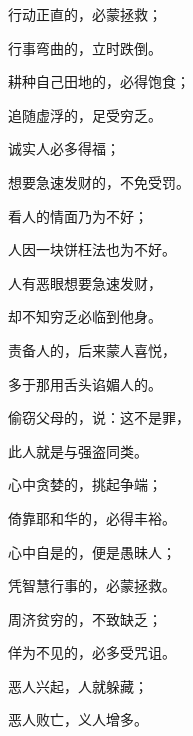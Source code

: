 {\par }{\Q {}行动正直的，必蒙拯救；
\par }{\Q 行事弯曲的，立时跌倒。
\par }{\Q {}耕种自己田地的，必得饱食；
\par }{\Q 追随虚浮的，足受穷乏。
\par }{\Q {}诚实人必多得福；
\par }{\Q 想要急速发财的，不免受罚。
\par }{\Q {}看人的情面乃为不好；
\par }{\Q 人因一块饼枉法也为不好。
\par }{\Q {}人有恶眼想要急速发财，
\par }{\Q 却不知穷乏必临到他身。
\par }{\Q {}责备人的，后来蒙人喜悦，
\par }{\Q 多于那用舌头谄媚人的。
\par }{\Q {}偷窃父母的，说：这不是罪，
\par }{\Q 此人就是与强盗同类。
\par }{\Q {}心中贪婪的，挑起争端；
\par }{\Q 倚靠耶和华的，必得丰裕。
\par }{\Q {}心中自是的，便是愚昧人；
\par }{\Q 凭智慧行事的，必蒙拯救。
\par }{\Q {}周济贫穷的，不致缺乏；
\par }{\Q 佯为不见的，必多受咒诅。
\par }{\Q {}恶人兴起，人就躲藏；
\par }{\Q 恶人败亡，义人增多。

}
